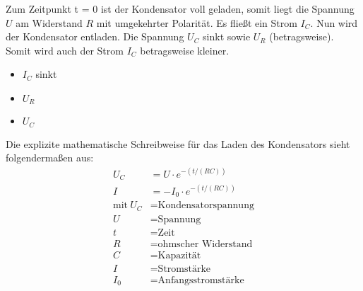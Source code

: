 Zum Zeitpunkt t = 0 ist der Kondensator voll geladen, somit liegt die Spannung $U$ am Widerstand $R$ mit umgekehrter Polarität. Es fließt ein Strom $I_C$. Nun wird der Kondensator entladen. Die Spannung $U_C$ sinkt sowie $U_R$ (betragsweise). Somit wird auch der Strom $I_C$ betragsweise kleiner.\\
\begin{itemize}
\item $I_C$ sinkt
\end{itemize}
\begin{itemize}
\item $U_R$
\end{itemize}
\begin{itemize}
\item $U_C$
\end{itemize}
Die explizite mathematische Schreibweise für das Laden des Kondensators sieht folgendermaßen aus:
\begin{align*}
U_C &= U \cdot e^{-(t/(RC))}\\
I &= -I_0 \cdot e^{-(t/(RC))}\\
\text{mit} \ U_C &= \text{Kondensatorspannung}\\
U &= \text{Spannung}\\
t &= \text{Zeit}\\
R &= \text{ohmscher Widerstand}\\
C &= \text{Kapazität}\\
I &= \text{Stromstärke}\\
I_0 &= \text{Anfangsstromstärke}\\
\end{align*}






